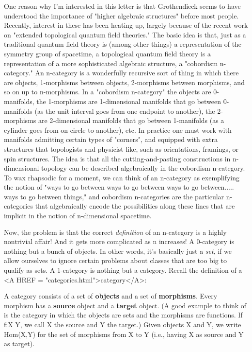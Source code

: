 One reason why I'm interested in this letter is that Grothendieck seems
to have understood the importance of "higher algebraic structures"
before most people.  Recently, interest in these has been heating up,
largely because of the recent work on "extended topological quantum
field theories."  The basic idea is that, just as a traditional quantum
field theory is (among other things) a representation of the symmetry
group of spacetime, a topological quantum field theory is a
representation of a more sophisticated algebraic structure, a "cobordism
n-category."  An n-category is a wonderfully recursive sort of thing in
which there are objects, 1-morphisms between objects, 2-morphisms
between morphisms, and so on up to n-morphisms.  In a "cobordism
n-category" the objects are 0-manifolds, the 1-morphisms are
1-dimensional manifolds that go between 0-manifolds (as the unit
interval goes from one endpoint to another), the 2-morphisms are
2-dimensional manifolds that go between 1-manifolds (as a cylinder goes
from on circle to another), etc.  In practice one must work with
manifolds admitting certain types of "corners", and equipped with extra
structures that topologists and physicist like, such as orientations,
framings, or spin structures.  The idea is that all the
cutting-and-pasting constructions in n-dimensional topology can be
described algebraically in the cobordism n-category.  To wax rhapsodic
for a moment, we can think of an n-category as exemplifying the notion
of "ways to go between ways to go between ways to go between..... ways
to go between things," and cobordism n-categories are the particular
n-categories that algebraically encode the possibilities along these
lines that are implicit in the notion of n-dimensional spacetime.

Now, the problem is that the correct \emph{definition} of an n-category is a
highly nontrivial affair!  And it gets more complicated as n increases! 
A 0-category is nothing but a bunch of objects.  In other words, it's
basically just a \emph{set}, if we allow ourselves to ignore certain problems
about classes that are too big to qualify as sets.  A 1-category is
nothing but a category.  Recall the definition of a <A HREF = "categories.html">category</A>: 

A category consists of a set of \textbf{objects}
and a set of \textbf{morphisms}.  Every
morphism has a \textbf{source} object and a \textbf{target} 
object.  (A good example to think
of is the category in which the objects are sets and the morphisms are
functions.  If f:X \to  Y, we call X the source and Y the target.)  Given
objects X and Y, we write Hom(X,Y) for the set of morphisms from X to Y
(i.e., having X as source and Y as target).

